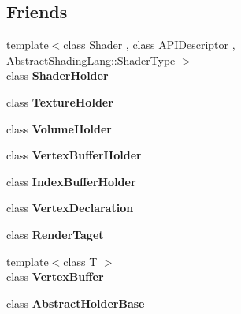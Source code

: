 \subsection*{Friends}
\begin{DoxyCompactItemize}
\item 
\hypertarget{class_tempest_1_1_device_a9478041b9d4218bb2c32ad6faa058c73}{{\footnotesize template$<$class Shader , class A\+P\+I\+Descriptor , Abstract\+Shading\+Lang\+::\+Shader\+Type $>$ }\\class {\bfseries Shader\+Holder}}\label{class_tempest_1_1_device_a9478041b9d4218bb2c32ad6faa058c73}

\item 
\hypertarget{class_tempest_1_1_device_a8bcfee155fddaa3e9e41bfa1fed743c3}{class {\bfseries Texture\+Holder}}\label{class_tempest_1_1_device_a8bcfee155fddaa3e9e41bfa1fed743c3}

\item 
\hypertarget{class_tempest_1_1_device_a2d28d4960c66ecddf6381f968d716a3c}{class {\bfseries Volume\+Holder}}\label{class_tempest_1_1_device_a2d28d4960c66ecddf6381f968d716a3c}

\item 
\hypertarget{class_tempest_1_1_device_a8f2a3cd0c6cd4d5675f10b94ff00271e}{class {\bfseries Vertex\+Buffer\+Holder}}\label{class_tempest_1_1_device_a8f2a3cd0c6cd4d5675f10b94ff00271e}

\item 
\hypertarget{class_tempest_1_1_device_a931bc0ce4135d164772c0f084bac3f11}{class {\bfseries Index\+Buffer\+Holder}}\label{class_tempest_1_1_device_a931bc0ce4135d164772c0f084bac3f11}

\item 
\hypertarget{class_tempest_1_1_device_ab06a983dd00466e5c373dab4c8ed7f29}{class {\bfseries Vertex\+Declaration}}\label{class_tempest_1_1_device_ab06a983dd00466e5c373dab4c8ed7f29}

\item 
\hypertarget{class_tempest_1_1_device_a2ea87a9035bbba1f37b3da751bbdee4e}{class {\bfseries Render\+Taget}}\label{class_tempest_1_1_device_a2ea87a9035bbba1f37b3da751bbdee4e}

\item 
\hypertarget{class_tempest_1_1_device_a2c3c2b2badf0dcf00f03fbbb0923757b}{{\footnotesize template$<$class T $>$ }\\class {\bfseries Vertex\+Buffer}}\label{class_tempest_1_1_device_a2c3c2b2badf0dcf00f03fbbb0923757b}

\item 
\hypertarget{class_tempest_1_1_device_a6d9407cd7dc68d6c7fc83a389edd65f7}{class {\bfseries Abstract\+Holder\+Base}}\label{class_tempest_1_1_device_a6d9407cd7dc68d6c7fc83a389edd65f7}

\end{DoxyCompactItemize}


